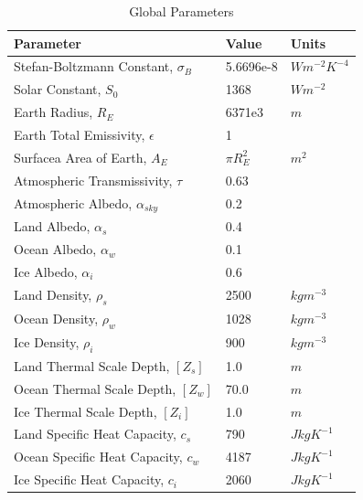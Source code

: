 \documentclass[12pt]{article}
\begin{document}
\begin{table}
    \captionsetup{singlelinecheck = false, justification=justified}
    \caption{Global Parameters}
    \begin{tabular}{lll}
    \hline
    Parameter & Value & Units\\
    \hline
    Stefan-Boltzmann Constant, $\sigma_B$ & 5.6696e-8 & $Wm^{-2}K^{-4}$ \\
    Solar Constant, $S_0$ & 1368 & $Wm^{-2}$ \\
    Earth Radius, $R_E$ & 6371e3 & $m$ \\
    Earth Total Emissivity, $\epsilon$  & 1  \\
    Surfacea Area of Earth, $A_E$ & $\pi R_E^2$ & $m^2$ \\
    Atmospheric Transmissivity, $\tau$ & 0.63  \\
    Atmospheric Albedo, $\alpha_{sky}$ & 0.2 \\
    Land Albedo, $\alpha_s$ & 0.4 \\
    Ocean Albedo, $\alpha_w$ & 0.1\\
    Ice Albedo, $\alpha_i$ & 0.6 \\
    Land Density, $\rho_s$ & 2500 & $kgm^{-3}$\\
    Ocean Density, $\rho_w$ & 1028 & $kgm^{-3}$\\
    Ice Density, $\rho_i$ & 900 & $kgm^{-3}$\\
    Land Thermal Scale Depth, $[Z_s]$ & 1.0 & $m$ \\
    Ocean Thermal Scale Depth, $[Z_w]$ & 70.0 & $m$ \\
    Ice Thermal Scale Depth, $[Z_i]$ & 1.0 & $m$ \\
    Land Specific Heat Capacity, $c_s$ & 790 & $JkgK^{-1}$\\
    Ocean Specific Heat Capacity, $c_w$ & 4187 & $JkgK^{-1}$\\
    Ice Specific Heat Capacity, $c_i$ & 2060 & $JkgK^{-1}$\\
    \end{tabular}
    \label{tab:globalparams}
\end{table}
\FloatBarrier
\end{document}

